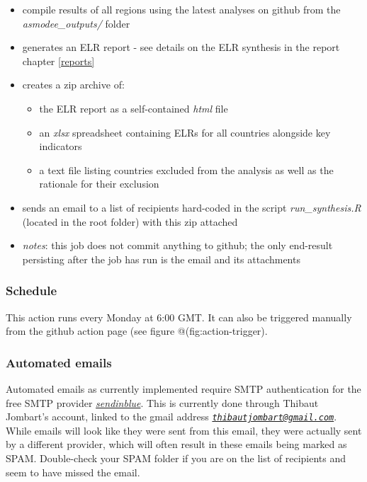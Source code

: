 \documentclass[]{book}
\providecommand{\tightlist}{%
  \setlength{\itemsep}{0pt}\setlength{\parskip}{0pt}}
\begin{document}
\begin{itemize}
\tightlist
\item
  compile results of all regions using the latest analyses on github from the
  \emph{asmodee\_outputs/} folder
\item
  generates an ELR report - see details on the ELR synthesis in the report
  chapter \ref{reports}
\item
  creates a zip archive of:

  \begin{itemize}
  \tightlist
  \item
    the ELR report as a self-contained \emph{html} file
  \item
    an \emph{xlsx} spreadsheet containing ELRs for all countries alongside key indicators
  \item
    a text file listing countries excluded from the analysis as well as the
    rationale for their exclusion
  \end{itemize}
\item
  sends an email to a list of recipients hard-coded in the script
  \emph{run\_synthesis.R} (located in the root folder) with this zip attached
\item
  \emph{notes}: this job does not commit anything to github; the only end-result
  persisting after the job has run is the email and its attachments
\end{itemize}

\hypertarget{schedule-2}{%
\subsubsection{Schedule}\label{schedule-2}}

This action runs every Monday at 6:00 GMT. It can also be triggered
manually from the github action page (see figure @(fig:action-trigger).

\hypertarget{automated-emails}{%
\subsubsection{Automated emails}\label{automated-emails}}

Automated emails as currently implemented require SMTP authentication for the
free SMTP provider \href{https://www.sendinblue.com/}{\emph{sendinblue}}. This is
currently done through Thibaut Jombart's account, linked to the gmail address
\emph{\href{mailto:thibautjombart@gmail.com}{\nolinkurl{thibautjombart@gmail.com}}}. While emails will look like they were sent from
this email, they were actually sent by a different provider, which will often
result in these emails being marked as SPAM. Double-check your SPAM folder if
you are on the list of recipients and seem to have missed the email.
\end{document}
